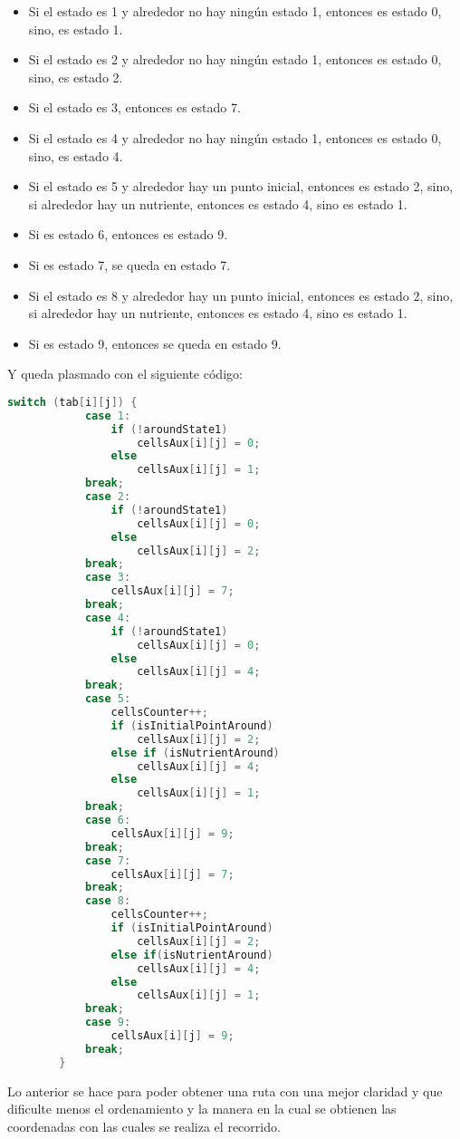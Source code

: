     \begin{itemize}
        \item Si el estado es 1 y alrededor no hay ning\'un estado 1, entonces es estado 0, sino, es estado 1.
        \item Si el estado es 2 y alrededor no hay ning\'un estado 1, entonces es estado 0, sino, es estado 2.
        \item Si el estado es 3, entonces es estado 7.
        \item Si el estado es 4 y alrededor no hay ning\'un estado 1, entonces es estado 0, sino, es estado 4.
        \item Si el estado es 5 y alrededor hay un punto inicial, entonces es estado 2, sino, si alrededor hay un nutriente, entonces es estado 4, sino es estado 1.
        \item Si es estado 6, entonces es estado 9.
        \item Si es estado 7, se queda en estado 7.
        \item Si el estado es 8 y alrededor hay un punto inicial, entonces es estado 2, sino, si alrededor hay un nutriente, entonces es estado 4, sino es estado 1.
        \item Si es estado 9, entonces se queda en estado 9.
    \end{itemize}
    \vskip 0.5cm    
    Y queda plasmado con el siguiente c\'odigo:
    \vskip 0.5cm
    \begin{lstlisting}[language={C++}, caption={Ruta Ajuste 1}, label={Script}]
        switch (tab[i][j]) {
            case 1:
                if (!aroundState1)
                    cellsAux[i][j] = 0;
                else
                    cellsAux[i][j] = 1;
            break;
            case 2:
                if (!aroundState1)
                    cellsAux[i][j] = 0;
                else
                    cellsAux[i][j] = 2;
            break;
            case 3:
                cellsAux[i][j] = 7;
            break;
            case 4:
                if (!aroundState1)
                    cellsAux[i][j] = 0;
                else
                    cellsAux[i][j] = 4;
            break;
            case 5:
                cellsCounter++;
                if (isInitialPointAround)
                    cellsAux[i][j] = 2;
                else if (isNutrientAround)
                    cellsAux[i][j] = 4;
                else
                    cellsAux[i][j] = 1;
            break;
            case 6:
                cellsAux[i][j] = 9;
            break;
            case 7:
                cellsAux[i][j] = 7;
            break;
            case 8:
                cellsCounter++;
                if (isInitialPointAround)
                    cellsAux[i][j] = 2;
                else if(isNutrientAround)
                    cellsAux[i][j] = 4;
                else
                    cellsAux[i][j] = 1;
            break;
            case 9:
                cellsAux[i][j] = 9;
            break;
        }
    \end{lstlisting}
\vskip 0.5cm
    Lo anterior se hace para poder obtener una ruta con una
        mejor claridad y que dificulte menos el ordenamiento y la
        manera en la cual se obtienen las coordenadas con las cuales
        se realiza el recorrido.